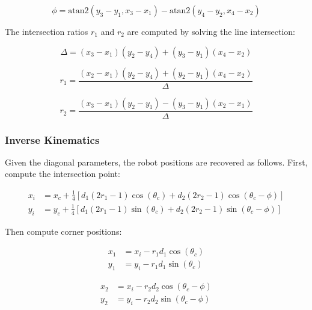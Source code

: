 \documentclass[lettersize,journal]{IEEEtran}
\begin{document}
\begin{equation}
\phi = \text{atan2}(y_3 - y_1, x_3 - x_1) - \text{atan2}(y_4 - y_2, x_4 - x_2)
\end{equation}

The intersection ratios $r_1$ and $r_2$ are computed by solving the line intersection:

\begin{equation}
\Delta = (x_3 - x_1)(y_2 - y_4) + (y_3 - y_1)(x_4 - x_2)
\end{equation}

\begin{equation}
r_1 = \frac{(x_2 - x_1)(y_2 - y_4) + (y_2 - y_1)(x_4 - x_2)}{\Delta}
\end{equation}

\begin{equation}
r_2 = \frac{(x_3 - x_1)(y_2 - y_1) - (y_3 - y_1)(x_2 - x_1)}{\Delta}
\end{equation}

\subsubsection{Inverse Kinematics}

Given the diagonal parameters, the robot positions are recovered as follows. First, compute the intersection point:

\begin{equation}
\begin{aligned}
x_i &= x_c + \frac{1}{4}\left[d_1(2r_1 - 1)\cos(\theta_c) + d_2(2r_2 - 1)\cos(\theta_c - \phi)\right] \\
y_i &= y_c + \frac{1}{4}\left[d_1(2r_1 - 1)\sin(\theta_c) + d_2(2r_2 - 1)\sin(\theta_c - \phi)\right]
\end{aligned}
\end{equation}

Then compute corner positions:

\begin{equation}
\begin{aligned}
x_1 &= x_i - r_1 d_1 \cos(\theta_c) \\
y_1 &= y_i - r_1 d_1 \sin(\theta_c)
\end{aligned}
\end{equation}

\begin{equation}
\begin{aligned}
x_2 &= x_i - r_2 d_2 \cos(\theta_c - \phi) \\
y_2 &= y_i - r_2 d_2 \sin(\theta_c - \phi)
\end{aligned}
\end{equation}
\end{document}
